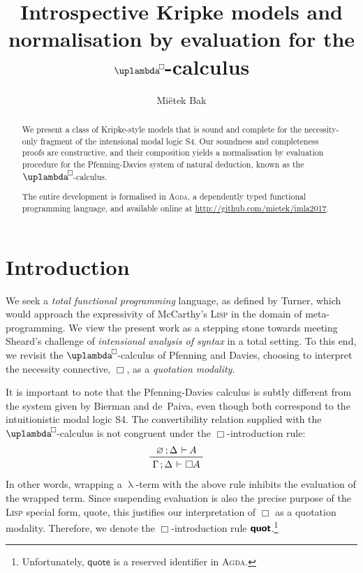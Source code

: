 \documentclass[submission,copyright,creativecommons,sharealike,backref=page]{eptcs}
\title{Introspective Kripke models and\\
       normalisation by evaluation for the $\uplambdabox$-calculus}
\author{Mi{\"e}tek Bak
\email{\textrm{\normalsize{\href{mailto:mietek@bak.io}{mietek@bak.io}}}}}
\newcommand{\uplambdabox}{\uplambda^{\mkern-3mu\Box\mkern-3mu}}
\newcommand{\sA}{\mkern-2muA}
\renewcommand{\:}{\mathop{\mkern3mu:\mkern3mu}}
\renewcommand{\.}{\mathop{\mkern3mu.\mkern3mu}}
\renewcommand{\;}{\mathop{;}}
\renewcommand{\,}{\mathop{,}}
\newcommand{\e}{\mathrel{\mkern2mu\vdash\mkern1mu}}
\newcommand{\quot}{\operatorname{\textsf{\textbf{quot}}}}
\renewcommand{\O}{\varnothing}
\theoremstyle{mystyle}
\begin{document}
\maketitle

\begin{abstract}
We present a class of Kripke-style models that is sound and complete for the necessity-only fragment of the intensional modal logic S4.  Our soundness and completeness proofs are constructive, and their composition yields a normalisation by evaluation procedure for the Pfenning-Davies system of natural deduction, known as the $\uplambdabox$-calculus.

The entire development is formalised in \textsc{Agda}, a dependently typed functional programming language, and available online at \href{http://github.com/mietek/imla2017}{http://github.com/mietek/imla2017}.
\end{abstract}


\section*{Introduction}

We seek a \emph{total functional programming} language, as defined by Turner\cite{Turner04}, which would approach the expressivity of McCarthy's\cite{McCarthyAEHL62} \textsc{Lisp} in the domain of meta-programming.  We view the present work as a stepping stone towards meeting Sheard's\cite{Sheard01} challenge of \emph{intensional analysis of syntax} in a total setting.  To this end, we revisit the $\uplambdabox$-calculus of Pfenning and Davies\cite{PfenningD01}, choosing to interpret the necessity connective, $\Box$, as a \emph{quotation modality}.

It is important to note that the Pfenning-Davies calculus is subtly different from the system given by Bierman and de~Paiva\cite{BiermanP00}, even though both correspond to the intuitionistic modal logic S4.  The convertibility relation supplied with the $\uplambdabox$-calculus is not congruent under the $\Box$-introduction rule:
\begin{align*}
  & \prftree
     {\O \; \Delta \e \sA}
     {\Gamma \; \Delta \e \Box A}
\end{align*}
In other words, wrapping a $\uplambda$-term with the above rule inhibits the evaluation of the wrapped term.  Since suspending evaluation is also the precise purpose of the \textsc{Lisp} special form, \textsf{quote}, this justifies our interpretation of $\Box$ as a quotation modality.  Therefore, we denote the $\Box$-introduction rule $\quot$.\footnote{Unfortunately, $\textsf{quote}$ is a reserved identifier in \textsc{Agda}.}
\end{document}
